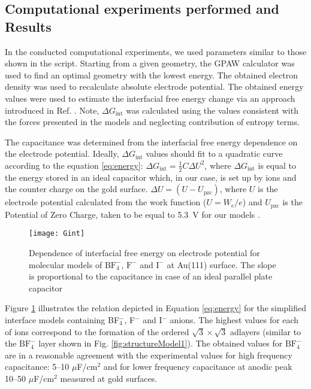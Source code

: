 \documentclass[a4paper,10pt]{article}
\begin{document}
\subsection{Computational experiments performed and Results\label{results}}

In the conducted computational experiments, we used parameters similar to those shown in the script. Starting from a given geometry, the GPAW calculator was used to find an optimal geometry with the lowest energy. The obtained electron density was used to recalculate absolute electrode potential. The obtained energy values were used to estimate the interfacial free energy change via an approach introduced in Ref. \cite{rossmeisl}. Note, $\Delta G_\mathrm{int}$ was calculated using the values consistent with the forces presented in the models and neglecting contribution of entropy terms.

The capacitance was determined from the interfacial free energy dependence on the electrode potential. Ideally, $\Delta G_\mathrm{int}$ values should fit to a quadratic curve according to the equation \ref{eq:energy}: $\Delta G_\mathrm{int} = \frac12 C\Delta U^2$, where $\Delta G_\mathrm{int}$ is equal to the energy stored in an ideal capacitor which, in our case, is set up by ions and the counter charge on the gold surface. $\Delta U = (U - U_\mathrm{pzc})$, where $U$ is the electrode potential calculated from the work function ($U = W_e/e$) and $U_\mathrm{pzc}$ is the Potential of Zero Charge, taken to be equal to 5.3~V for our models \cite{ivanistsev2012}.

\begin{figure}
\centering
\texttt{[image: Gint]}
\caption{Dependence of  interfacial free energy on electrode potential for molecular models of $\mathrm{BF}_4^-$,  $\mathrm{F}^-$ and $\mathrm{I}^-$ at Au(111) surface. The slope is proportional to the capacitance in case of an ideal parallel plate capacitor}
\label{fig:GU2}
\end{figure}

Figure \ref{fig:GU2} illustrates the relation depicted in Equation \ref{eq:energy} for the simplified interface models containing BF$_4^-$, F$^-$ and I$^-$ anions. The highest values for each of ions correspond to the formation of the ordered $\sqrt{3}\times\sqrt{3}$ adlayers (similar to the $\mathrm{BF}_4^-$ layer shown in Fig. \ref{fig:structureModel1}). The obtained values for $\mathrm{BF}_4^-$ are in a reasonable agreement with the experimental values for high frequency capacitance: 5--10 $\mu$F/cm$^2$ \cite{gnahm2010,Gnahm2011,Su2013} and for lower frequency capacitance at anodic peak 10--50 $\mu$F/cm$^2$ \cite{gnahm2010,Gnahm2011,Su2013} measured at gold surfaces.
\end{document}
